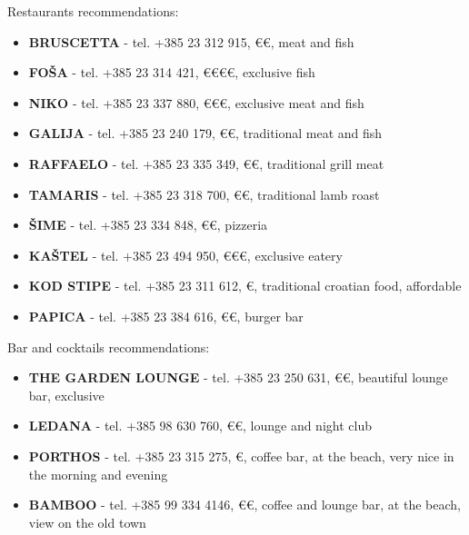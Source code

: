 \documentclass[12pt]{article}
\begin{document}
\begin{center}
\Huge
Restaurants recommendations:
\end{center}
\uwave{\hspace{15cm}}

\begin{itemize}
\item \textbf{BRUSCETTA} - tel. +385 23 312 915, €€, meat and fish 
\item \textbf{FOŠA} - tel. +385 23 314 421, €€€€, exclusive fish
\item \textbf{NIKO} - tel. +385 23 337 880, €€€, exclusive meat and fish
\item \textbf{GALIJA} - tel. +385 23 240 179, €€, traditional meat and fish
\item \textbf{RAFFAELO} - tel. +385 23 335 349, €€, traditional grill meat
\item \textbf{TAMARIS} - tel. +385 23 318 700, €€, traditional lamb roast
\item \textbf{ŠIME} - tel. +385 23 334 848, €€, pizzeria
\item \textbf{KAŠTEL} - tel. +385 23 494 950, €€€, exclusive eatery
\item \textbf{KOD STIPE} - tel. +385 23 311 612, €, traditional croatian food, affordable
\item \textbf{PAPICA} - tel. +385 23 384 616, €€, burger bar
\end{itemize}

\vspace{0.5cm}

\begin{center}
\Huge
Bar and cocktails recommendations:
\end{center}
\uwave{\hspace{15cm}}

\begin{itemize}
\item \textbf{THE GARDEN LOUNGE} - tel. +385 23 250 631, €€, beautiful lounge bar, exclusive
\item \textbf{LEDANA} - tel. +385 98 630 760, €€, lounge and night club
\item \textbf{PORTHOS} - tel. +385 23 315 275, €, coffee bar, at the beach, very nice in the morning and evening
\item \textbf{BAMBOO} - tel. +385 99 334 4146, €€, coffee and lounge bar, at the beach, view on the old town

\end{itemize}
\end{document}
